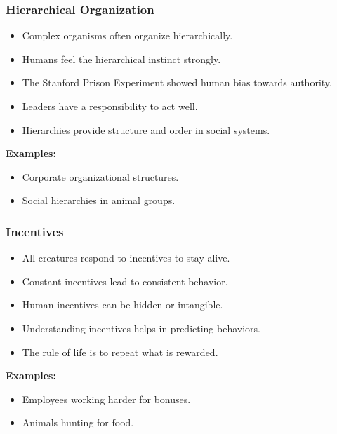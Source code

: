 \begin{frame}[fragile]\frametitle{Hierarchical Organization}
\begin{itemize}
    \item Complex organisms often organize hierarchically.
    \item Humans feel the hierarchical instinct strongly.
    \item The Stanford Prison Experiment showed human bias towards authority.
    \item Leaders have a responsibility to act well.
    \item Hierarchies provide structure and order in social systems.
\end{itemize}
\textbf{Examples:}
\begin{itemize}
    \item Corporate organizational structures.
    \item Social hierarchies in animal groups.
\end{itemize}
\end{frame}

\begin{frame}[fragile]\frametitle{Incentives}
\begin{itemize}
    \item All creatures respond to incentives to stay alive.
    \item Constant incentives lead to consistent behavior.
    \item Human incentives can be hidden or intangible.
    \item Understanding incentives helps in predicting behaviors.
    \item The rule of life is to repeat what is rewarded.
\end{itemize}
\textbf{Examples:}
\begin{itemize}
    \item Employees working harder for bonuses.
    \item Animals hunting for food.
\end{itemize}
\end{frame}

